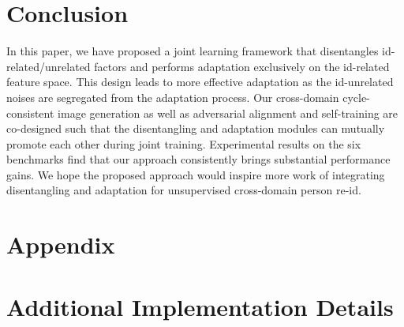 \documentclass[runningheads]{llncs}
\begin{document}
\section{Conclusion}

In this paper, we have proposed a joint learning framework that disentangles id-related/unrelated factors and performs adaptation exclusively on the id-related feature space. This design leads to more effective adaptation as the id-unrelated noises are segregated from the adaptation process. Our cross-domain cycle-consistent image generation as well as adversarial alignment and self-training are co-designed such that the disentangling and adaptation modules can mutually promote each other during joint training. Experimental results on the six benchmarks find that our approach consistently brings substantial performance gains. We hope the proposed approach would inspire more work of integrating disentangling and adaptation for unsupervised cross-domain person re-id.






















\clearpage



\clearpage

\section*{Appendix}

\setcounter{table}{2}
\setcounter{figure}{6}

\appendix

\section{Additional Implementation Details}
\end{document}

